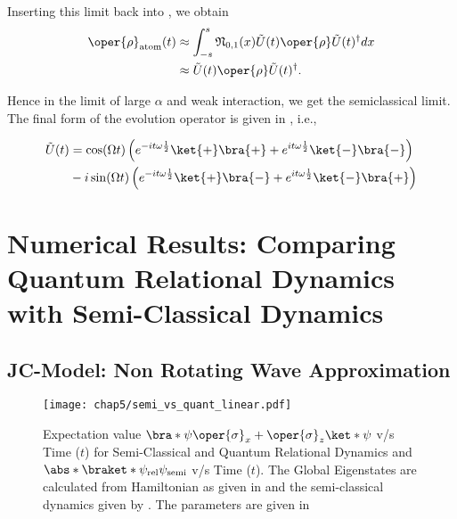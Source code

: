 Inserting this limit back into , we obtain
\begin{align}
    \oper{\rho}_{\text{atom}}(t) &\approx \int_{-s}^{s} \mathfrak{N}_{0, 1}(x) \tilde{U}(t) \oper{\rho} \tilde{U}(t)^{\dagger} dx \nonumber\\
        &\approx \tilde{U}(t) \oper{\rho} \tilde{U}(t)^{\dagger}.
\end{align}

Hence in the limit of large \(\alpha\) and weak interaction, we get the 
semiclassical limit. The final form of the evolution operator is given in , i.e., 

\begin{mdframed}
    \begin{align}
    \label{eq:appen_JCM_V_g_limit2}
    \tilde{U}(t) 
    &= \cos(\Omega t) \left(e^{-i t \omega \frac{1}{2}}\ket{+}\bra{+} + 
    e^{i t \omega \frac{1}{2}}\ket{-}\bra{-} \right)  \nonumber \\
    &- i \sin(\Omega t)
     \left( e^{-i t \omega \frac{1}{2}}\ket{+}\bra{-}
    + e^{i t \omega \frac{1}{2}}\ket{-}\bra{+}\right) 
\end{align}
\end{mdframed}

\section{Numerical Results: Comparing Quantum Relational Dynamics with Semi-Classical Dynamics
\label{sec:chap5_numerical_results}}

\subsection*{JC-Model: Non Rotating Wave Approximation} 
\begin{figure}[!h]
    \centering
    \texttt{[image: chap5/semi\_vs\_quant\_linear.pdf]}
    \caption{Expectation value
        \(\bra*{\psi} \oper{\sigma}_x + \oper{\sigma}_z \ket*{\psi}\) v/s Time ($t$) for Semi-Classical and Quantum Relational Dynamics
    and \(\abs*{\braket*{\psi_{\mathrm{rel}}}{\psi_{\mathrm{semi}}}}\) v/s Time ($t$). The Global Eigenstates are calculated from 
    Hamiltonian as given in  and the semi-classical dynamics given by . The parameters 
    are given in 
    }
     \label{fig:chap5_linear_semi_vs_quant}
\end{figure}


